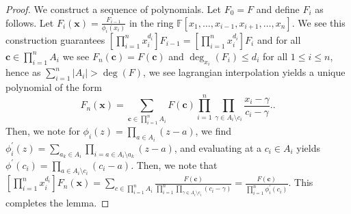 \begin{proof}
	We construct a sequence of polynomials. Let \(F_0 = F\) and define \(F_{i}\) as follows. Let \(F_{i}\left( \textbf{x} \right) = \frac{F_{i-1}}{\phi _{i} \left( x_{i} \right)}\) in the ring \(\mathbb{F}\left[ x_1, \ldots, x_{i-1}, x_{i+1}, \ldots, x_{n} \right] \). We see this construction guarantees \(\left[ \prod_{i= 1}^{n} x_{i}^{d_{i}} \right] F_{i-1} = \left[ \prod_{i= 1}^{n} x_{i}^{d_{i}} \right] F_{i}  \) and for all \(\textbf{c} \in \prod_{i= 1}^{n} A_{i}\) we see \(F_{n}\left( \textbf{c} \right) = F\left( \textbf{c} \right)  \) and \(\deg _{x_{i}} \left( F_{i} \right) \le d_{i} \) for all \(1 \le i \le n\), hence as \(\sum_{i= 1}^{n} \left| A_{i} \right|  > \deg \left( F \right) \), we see lagrangian interpolation yields a unique polynomial of the form \[
		F_{n}\left( \textbf{x} \right) = \sum_{\textbf{c} \in \prod_{i= 1}^{n} A_{i}}^{}  F\left( \textbf{c} \right) \prod_{i= 1}^{n} \prod_{\gamma \in A_{i}  \setminus c_{i}}^{} \frac{x_{i} - \gamma}{c_{i} - \gamma}.
	.\] Then, we note for \(\phi _{i}\left( z \right)  = \prod_{a \in A_{i}}^{} \left( z-a \right) \), we find \(\phi^{\prime}_{i}\left( z \right)  = \sum_{a_{k} \in A_{i}}^{} \prod_{i=a \in A_{i} \setminus a_{k}}^{} \left( z -a \right) \), and evaluating at a \(c_{i} \in A_{i}\) yields \(\phi^{\prime}\left( c_{i} \right)  = \prod_{a \in A_{i} \setminus c_{i}}^{} \left( c_{i} - a \right) \). Then, we note that \(\left[ \prod_{i= 1}^{n} x_{i}^{d_{i}} \right] F_{n}\left( \textbf{x} \right) = \sum_{c \in \prod_{i= 1}^{n} A_{i}}^{} \frac{F\left( \textbf{c} \right) }{\prod_{i= 1}^{n} \prod_{\gamma \in A_{i} \setminus c_{i}}^{} \left( c_{i} - \gamma \right) } = \frac{F\left( \textbf{c} \right) }{\prod_{i= 1}^{n} \phi _{i} ^{\prime} \left( c_{i} \right) } \). This completes the lemma.
\end{proof}
